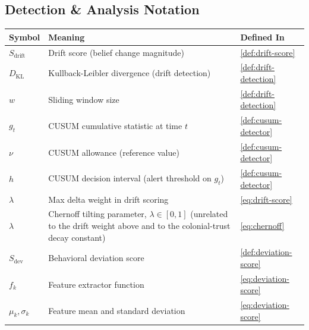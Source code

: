 \documentclass[
]{article}
\newcounter{none} %
\begin{document}
\subsection{Detection \& Analysis
Notation}\label{detection-analysis-notation}

{\def\LTcaptype{none} %
\begin{longtable}[]{@{}
  >{\raggedright\arraybackslash}p{}
  >{\raggedright\arraybackslash}p{}
  >{\raggedright\arraybackslash}p{}@{}}
\toprule\noalign{}
\begin{minipage}[b]{\linewidth}\raggedright
Symbol
\end{minipage} & \begin{minipage}[b]{\linewidth}\raggedright
Meaning
\end{minipage} & \begin{minipage}[b]{\linewidth}\raggedright
Defined In
\end{minipage} \\
\midrule\noalign{}
\endhead
\bottomrule\noalign{}
\endlastfoot
\(S_{\text{drift}}\) & Drift score (belief change magnitude) &
\cref{def:drift-score} \\
\(D_{\text{KL}}\) & Kullback-Leibler divergence (drift detection) &
\cref{def:drift-detection} \\
\(w\) & Sliding window size & \cref{def:drift-detection} \\
\(g_t\) & CUSUM cumulative statistic at time \(t\) &
\cref{def:cusum-detector} \\
\(\nu\) & CUSUM allowance (reference value) &
\cref{def:cusum-detector} \\
\(h\) & CUSUM decision interval (alert threshold on \(g_t\)) &
\cref{def:cusum-detector} \\
\(\lambda\) & Max delta weight in drift scoring &
\cref{eq:drift-score} \\
\(\lambda\) & Chernoff tilting parameter, \(\lambda \in [0,1]\)
(unrelated to the drift weight above and to the colonial-trust decay
constant) & \cref{eq:chernoff} \\
\(S_{\text{dev}}\) & Behavioral deviation score &
\cref{def:deviation-score} \\
\(f_k\) & Feature extractor function & \cref{eq:deviation-score} \\
\(\mu_k, \sigma_k\) & Feature mean and standard deviation &
\cref{eq:deviation-score} \\

\end{longtable}}
\end{document}
